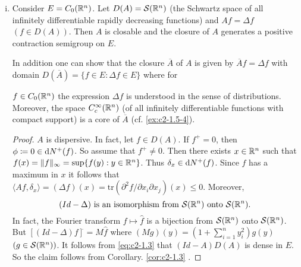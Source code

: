 \begin{examples}
\begin{enumerate}[(i), wide, labelsep=1em, itemindent=\parindent]
\begin{proof}
Second case: $p = 1$.
Let $\phi(x) = 1$ for $x \in M$ and $\phi(x) = 0$ for $x \not\in M$. 
Then $\phi \in \diff{N^{+}}(f)$ and
\begin{align*}
\langle Af,\phi \rangle &= \sum_{n} \int_{a_{n}}^{b_{n}} f''(x) \, \dx = \sum_{n} (f'(b_{n}) - f'(a_{n})) \leq 0
\end{align*}
since $f'(b_{n}) \leq 0$ and $f'(a_{n}) \geq 0$ for all $n$.

We have shown that $A$ is dispersive. 
As in \ref{ex:c2-1.5-1}   one shows that $(Id - A)$ is surjective. 
Now the claim follows from Theorem \ref{thm:c2-1.2}  .
\end{proof}

\item \label{ex:c2-1.5-3} 
Consider $E = C_{0}(\mathbb{R}^{n})$. 
Let $D(A) = \mathcal{S}(\mathbb{R}^{n})$ (the Schwartz space of all infinitely differentiable rapidly decreasing functions) and $Af = \Delta f$ $(f \in D(A))$. 
Then $A$ is closable and the closure of $A$ generates a positive contraction semigroup on $E$.

\begin{remark*}\label{rem:c2-1.2}
In addition one can show that the closure $\overline{A}$ of $A$ is given by $\overline{A}f = \Delta f$ with domain $D(\overline{A}) = \{f \in E : \Delta f \in E\}$ where for

$f \in C_{0}(\mathbb{R}^{n})$ the expression $\Delta f$ is understood in the sense of distributions. 
Moreover, the space $C_{c}^{\infty}(\mathbb{R}^{n})$ (of all infinitely differentiable functions with compact support) is a core of $\overline{A}$ (cf. \ref{ex:c2-1.5-4}).
\end{remark*}

\begin{proof}
$A$ is dispersive. 
In fact, let $f \in D(A)$. 
If $f^{+} = 0$, then $\phi \coloneqq 0 \in \mathop{}\!\mathrm{d}{N^{+}}(f)$. 
So assume that $f^{+} \neq 0$. 
Then there exists $x \in \mathbb{R}^{n}$ such that $f(x) = \|f\|_{\infty} = \sup\{f(y) : y \in \mathbb{R}^{n}\}$. 
Thus $\delta_{x} \in \mathop{}\!\mathrm{d}{N^{+}}(f)$.
Since $f$ has a maximum in $x$ it follows that $\langle Af,\delta_{x} \rangle = (\Delta f)(x) = \text{tr}(\partial^{2}f/\partial x_{i}\partial x_{j})(x) \leq 0$. 
Moreover,
\begin{equation}\label{eq:c2-1.3}
(Id - \Delta) \text{ is an isomorphism from } \mathcal{S}(\mathbb{R}^{n}) \text{ onto } \mathcal{S}(\mathbb{R}^{n}).
\end{equation}
In fact, the Fourier transform $f \mapsto \hat{f}$ is a bijection from $\mathcal{S}(\mathbb{R}^{n})$ onto $\mathcal{S}(\mathbb{R}^{n})$.
But $[(Id - \Delta)f]^{\hat{}} = M\hat{f}$ where $(Mg)(y) = (1 + \sum_{i=1}^{n} y_{i}^{2})g(y)$ $(g \in \mathcal{S}(\mathbb{R}^{n}))$. It follows from \eqref{eq:c2-1.3}    that $(Id - A)D(A)$ is dense in $E$. So the claim follows from Corollary. \ref{cor:c2-1.3}  .
\end{proof}


\end{enumerate}
\end{examples}
